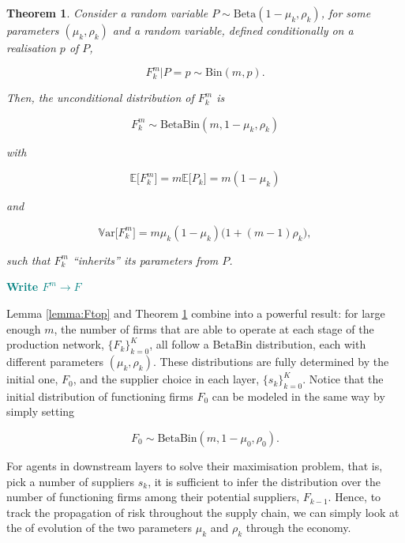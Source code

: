 \documentclass[american, abstract=on]{scrartcl}
\theoremstyle{plain}
\newtheorem{theorem}{Theorem}
\newcommand{\E}{\mathbb{E}}
\newcommand{\V}{\mathbb{V}\text{ar}}
\newcommand{\Beta}{\text{Beta}}
\newcommand{\Bin}{\text{Bin}}
\newcommand\notes[1]{\textcolor{teal}{\footnotesize \textbf{#1}}}
\begin{document}
\begin{theorem} \label{theorem:ptoF}
  Consider a random variable $P \sim \Beta(1 - \mu_k, \rho_k)$, for some parameters $(\mu_k, \rho_k)$ and a random variable, defined conditionally on a realisation $p$ of $P$, 
  
  \begin{equation}
    F^m_k \vert P = p \sim \Bin(m, p).
  \end{equation}

  Then, the unconditional distribution of $F^m_k$ is 

  \begin{equation}
    F^m_k \sim \Beta\Bin(m, 1 - \mu_k, \rho_k)
  \end{equation}

  with

  \begin{equation} \label{eq:mean_of_F}
    \E \big[F^m_k\big] = m \E \big[P_k\big] = m (1 - \mu_k)
  \end{equation}

  and 

  \begin{equation} \label{eq:var_of_F}
    \V \big[F^m_k\big] = m \mu_k (1 - \mu_k) \big(1 + (m - 1) \rho_k\big),
  \end{equation}

  such that $F^m_k$ ``inherits'' its parameters from $P$.
\end{theorem}

\notes{Write $F^m \to F$}

Lemma \ref*{lemma:Ftop} and Theorem \ref*{theorem:ptoF} combine into a powerful result: for large enough $m$, the number of firms that are able to operate at each stage of the production network, $\{F_k\}^{K}_{k = 0}$, all follow a BetaBin distribution, each with different parameters $(\mu_k, \rho_k)$. These distributions are fully determined by the initial one, $F_0$, and the supplier choice in each layer, $\{s_k\}^{K}_{k = 0}$. Notice that the initial distribution of functioning firms $F_0$ can be modeled in the same way by simply setting 

\begin{equation}
  F_0 \sim \Beta\Bin(m, 1 - \mu_0, \rho_0).
\end{equation}


For agents in downstream layers to solve their maximisation problem, that is, pick a number of suppliers $s_k$, it is sufficient to infer the distribution over the number of functioning firms among their potential suppliers, $F_{k - 1}$. Hence, to track the propagation of risk throughout the supply chain, we can simply look at the of evolution of the two parameters $\mu_k$ and $\rho_k$ through the economy.
\end{document}
